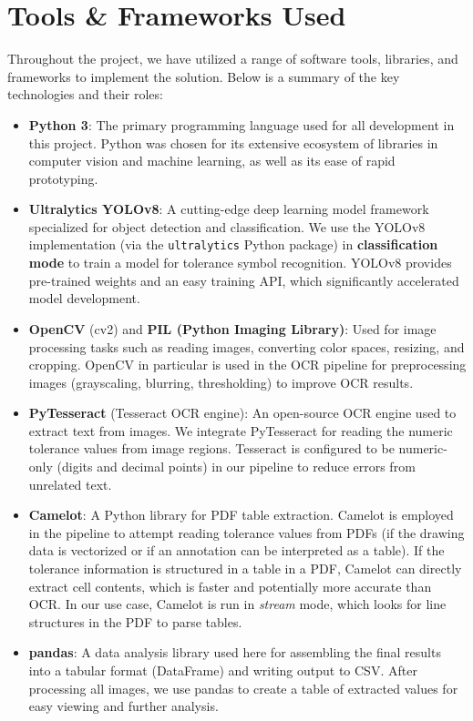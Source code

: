 \documentclass[11pt,a4paper]{article}
\begin{document}
\section{Tools \& Frameworks Used}
Throughout the project, we have utilized a range of software tools, libraries, and frameworks to implement the solution. Below is a summary of the key technologies and their roles:

\begin{itemize}
  \item \textbf{Python 3}: The primary programming language used for all development in this project. Python was chosen for its extensive ecosystem of libraries in computer vision and machine learning, as well as its ease of rapid prototyping.
  \item \textbf{Ultralytics YOLOv8}: A cutting-edge deep learning model framework specialized for object detection and classification. We use the YOLOv8 implementation (via the \verb|ultralytics| Python package) in \textbf{classification mode} to train a model for tolerance symbol recognition. YOLOv8 provides pre-trained weights and an easy training API, which significantly accelerated model development.
  \item \textbf{OpenCV} (cv2) and \textbf{PIL (Python Imaging Library)}: Used for image processing tasks such as reading images, converting color spaces, resizing, and cropping. OpenCV in particular is used in the OCR pipeline for preprocessing images (grayscaling, blurring, thresholding) to improve OCR results.
  \item \textbf{PyTesseract} (Tesseract OCR engine): An open-source OCR engine used to extract text from images. We integrate PyTesseract for reading the numeric tolerance values from image regions. Tesseract is configured to be numeric-only (digits and decimal points) in our pipeline to reduce errors from unrelated text.
  \item \textbf{Camelot}: A Python library for PDF table extraction. Camelot is employed in the pipeline to attempt reading tolerance values from PDFs (if the drawing data is vectorized or if an annotation can be interpreted as a table). If the tolerance information is structured in a table in a PDF, Camelot can directly extract cell contents, which is faster and potentially more accurate than OCR. In our use case, Camelot is run in \emph{stream} mode, which looks for line structures in the PDF to parse tables.
  \item \textbf{pandas}: A data analysis library used here for assembling the final results into a tabular format (DataFrame) and writing output to CSV. After processing all images, we use pandas to create a table of extracted values for easy viewing and further analysis.

\end{itemize}
\end{document}
